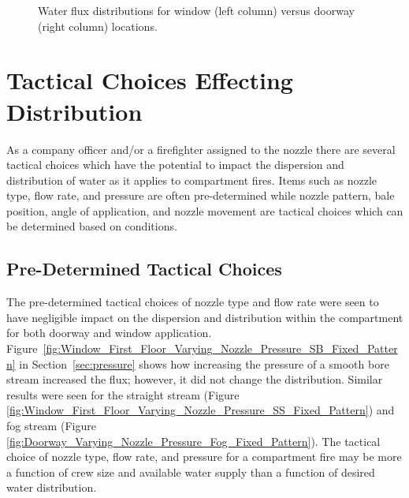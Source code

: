 \documentclass[12pt,oneside]{book}
\begin{document}
\begin{figure}[!ht]
\centering
{}
\caption[Doorway vs Window Application]{Water flux distributions for window (left column) versus doorway (right column) locations.}
\label{fig:Doorway_vs_Window}
\end{figure}

\section{Tactical Choices Effecting Distribution}

As a company officer and/or a firefighter assigned to the nozzle there are several tactical choices which have the potential to impact the dispersion and distribution of water as it applies to compartment fires. Items such as nozzle type, flow rate, and pressure are often pre-determined while nozzle pattern, bale position, angle of application, and nozzle movement are tactical choices which can be determined based on conditions.  

\subsection{Pre-Determined Tactical Choices}
The pre-determined tactical choices of nozzle type and flow rate were seen to have negligible impact on the dispersion and distribution within the compartment for both doorway and window application. Figure~\ref{fig:Window_First_Floor_Varying_Nozzle_Pressure_SB_Fixed_Pattern} in Section~\ref{sec:pressure} shows how increasing the pressure of a smooth bore stream increased the flux; however, it did not change the distribution. Similar results were seen for the straight stream (Figure \ref{fig:Window_First_Floor_Varying_Nozzle_Pressure_SS_Fixed_Pattern}) and fog stream (Figure \ref{fig:Doorway_Varying_Nozzle_Pressure_Fog_Fixed_Pattern}). The tactical choice of nozzle type, flow rate, and pressure for a compartment fire may be more a function of crew size and available water supply than a function of desired water distribution. 
\end{document}

